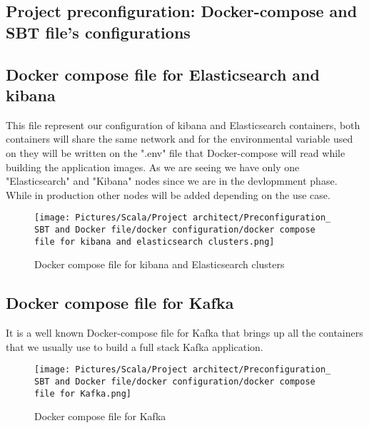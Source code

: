 \begin{spacing}{1.2}
\section{Project preconfiguration: Docker-compose and SBT file's configurations }



\subsection{Docker compose file for Elasticsearch and kibana}

\par 	
This file represent our configuration of kibana and Elasticsearch containers, both containers will share the same network and for the environmental variable used on they will be written on the ".env" file that Docker-compose will read while building the application images. 
As we are seeing we have only one "Elasticsearch" and "Kibana" nodes since we are in the devlopmment phase. While in production other nodes will be added depending on the use case.
\begin{figure}[!htb] 
\begin{center} 
\texttt{[image: Pictures/Scala/Project architect/Preconfiguration\_ SBT and Docker file/docker configuration/docker compose file for kibana and elasticsearch clusters.png]} 
\end{center} 
\caption{Docker compose file for kibana and Elasticsearch clusters}
\label{fig:configuration:kibananelastic}
\end{figure}  \FloatBarrier


\newpage
\subsection{Docker compose file for Kafka}

\par It is a well known Docker-compose file for Kafka that brings up all the containers that we usually use to build a full stack Kafka application.
\\
\begin{figure}[!htb] 
\begin{center} 
\texttt{[image: Pictures/Scala/Project architect/Preconfiguration\_ SBT and Docker file/docker configuration/docker compose file for Kafka.png]}
\label{fig:config-Docker-Kafka}
\end{center} 
\caption{Docker compose file for Kafka} 
\end{figure}  \FloatBarrier


\end{spacing}
